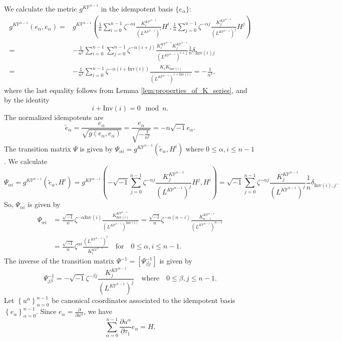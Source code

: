 \documentclass[12pt]{amsart}
\numberwithin{equation}{section}
\newcommand{\KP}{K\mathbb{P}}
\begin{document}
We calculate the metric $g^{\KP^{n-1}}$ in the idempotent basis $\{e_\alpha\}$:
\begin{align*}
 g^{\KP^{n-1}}\left(e_{\alpha},e_{\alpha}\right)
 =&g^{\KP^{n-1}}\left(\frac{1}{n}\sum_{i=0}^{n-1}\zeta^{-\alpha{i}}\frac{K^{\KP^{n-1}}_i}{(L^{\KP^{n-1}})^i}{H}^i,\frac{1}{n}\sum_{j=0}^{n-1}\zeta^{-\alpha{j}}\frac{K^{\KP^{n-1}}_j}{(L^{\KP^{n-1}})^j}{H}^j\right)\\
 =&-\frac{1}{n^2}\sum_{i=0}^{n-1}\sum_{j=0}^{n-1}\zeta^{-\alpha{(i+j)}}\frac{K^{\KP^{n-1}}_iK^{\KP^{n-1}}_j}{(L^{\KP^{n-1}})^{i+j}}\frac{1}{n}\delta_{\mathrm{Inv}(i)j}\\
  =&-\frac{1}{n^3}\sum_{i=0}^{n-1}\zeta^{-\alpha{(i+{\mathrm{Inv}(i)})}}\frac{K_iK_{\mathrm{Inv}(i)}}{(L^{\KP^{n-1}})^{i+{\mathrm{Inv}(i)}}}
 =-\frac{1}{n^2},
\end{align*}
where the last equality follows from  Lemma \ref{lem:properties_of_K_series}, and by the identity $$i+{\mathrm{Inv}(i)}=0\mod{n}.$$
The normalized idempotents are
\begin{equation}\label{def:normalized_idempotent}
\widetilde{e}_{\alpha}=\frac{e_{\alpha}}{\sqrt{g\left(e_{\alpha},e_{\alpha}\right)}}=\frac{e_{\alpha}}{\sqrt{-\frac{1}{n^2}}}=-n\sqrt{-1}e_{\alpha}.
\end{equation}
The transition matrix $\Psi$ is given by $\Psi_{\alpha{i}}=g^{\KP^{n-1}}\left(\widetilde{e}_{\alpha},H^i\right)$ where $0\leq \alpha,i\leq n-1$. We calculate
\begin{equation*}
\Psi_{\alpha{i}}
=g^{\KP^{n-1}}\left(\widetilde{e}_{\alpha},H^i\right)
=g^{\KP^{n-1}}\left(-\sqrt{-1}\sum_{j=0}^{n-1}\zeta^{-\alpha{j}}\frac{K^{\KP^{n-1}}_j}{(L^{\KP^{n-1}})^j}H^j,H^i\right)
=\sqrt{-1}\sum_{j=0}^{n-1}\zeta^{-\alpha{j}}\frac{K^{\KP^{n-1}}_j}{(L^{\KP^{n-1}})^j}\frac{1}{n}\delta_{\mathrm{Inv}(i),j}.
\end{equation*}
So, $\Psi_{\alpha{i}}$ is given by
\begin{equation*}
\begin{split}
\Psi_{\alpha{i}}
&=\frac{\sqrt{-1}}{n}\zeta^{-\alpha{\mathrm{Inv}(i)}}\frac{K^{\KP^{n-1}}_{\mathrm{Inv}(i)}}{(L^{\KP^{n-1}})^{\mathrm{Inv}(i)}}=\frac{\sqrt{-1}}{n}\zeta^{-\alpha(n-i)}\frac{K^{\KP^{n-1}}_{n-i}}{(L^{\KP^{n-1}})^{n-i}}\\
&=\frac{\sqrt{-1}}{n}\zeta^{\alpha{i}}\frac{(L^{\KP^{n-1}})^{i}}{K^{\KP^{n-1}}_{i}}\quad\text{for}\quad 0\leq \alpha,i\leq n-1. 
\end{split}
\end{equation*}
The inverse of the transition matrix $\Psi^{-1}=\left[\Psi^{-1}_{\beta{j}}\right]$ is given by
\begin{equation*}
\Psi^{-1}_{{j}\beta}=-\sqrt{-1}\zeta^{-\beta{j}}\frac{K^{\KP^{n-1}}_{j}}{(L^{\KP^{n-1}})^{j}}\quad\text{where}\quad 0\leq\beta,j\leq n-1.
\end{equation*}
Let $\left\{u^{\alpha}\right\}_{\alpha=0}^{n-1}$ be canonical coordinates associated to the idempotent basis $\left\{e_{\alpha}\right\}_{\alpha=0}^{n-1}$. Since $e_{\alpha}=\frac{\partial}{\partial{u^{\alpha}}}$, we have
\begin{equation}\label{eq:idempotenttophi_1}
\sum_{\alpha=0}^{n-1}\frac{\partial {u^{\alpha}}}{\partial{\tau_1}}e_{\alpha}=H.
\end{equation}
\end{document}
